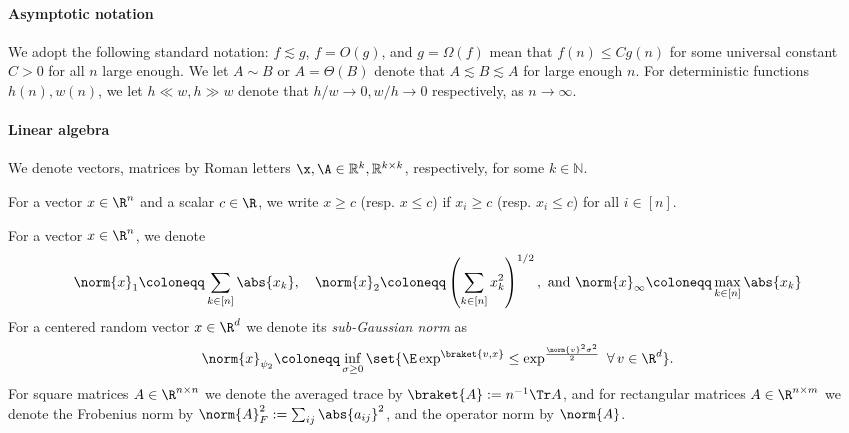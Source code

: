 \paragraph*{Asymptotic notation}
We adopt the following standard notation: \(f \lesssim g\), \(f = O(g)\), and \(g = \Omega(f)\) mean that \(f(n) \leq Cg(n)\) for some universal constant \(C > 0\) for all \(n\) large enough.
We let $A \sim B$ or \(A = \Theta(B)\) denote that $A \lesssim B \lesssim A$ for large enough $n$.  
For deterministic functions $h(n), w(n)$, we let $h \ll w, h \gg w$ denote that $h/w \to 0, w/h \to 0$ respectively, as $n \to \infty$. 

\paragraph*{Linear algebra}
We denote vectors, matrices by Roman letters $\x, \A \in \mathbb{R}^k, \mathbb{R}^{k \times k}$, respectively, for some $k \in \mathbb{N}$. 

\noindent
For a vector \(x \in \R^n\) and a scalar \(c \in \R\), we write \(x \geq c\) (resp. \(x \leq c\)) if \(x_i \geq c\) (resp. \(x_i \leq c\)) for all \(i \in [n]\).

\noindent
For a vector \(x \in \R^n\), we denote 
\begin{equation}
\begin{aligned}
  \norm{x}_1 \coloneqq \sum_{k \in [n]} \abs{x_k}, \quad 
  \norm{x}_2 \coloneqq \left(\sum_{k \in [n]} x_k^2\right)^{1/2}, \text{ and }
  \norm{x}_{\infty} \coloneqq \max_{k \in [n]}\abs{x_k}
\end{aligned}
\end{equation}
For a centered random vector \(x \in \R^d\) we denote its \emph{sub-Gaussian norm} as
\begin{equation}
        \norm{x}_{\psi_2} \coloneqq \inf_{\sigma 
        \geq 0} \set{\E \exp^{\braket{v, x}} \leq \exp^{\frac{\norm{v}^2 \sigma^2}{2}}\ \forall\, v \in \R^d}.
\end{equation}
\noindent
For square matrices $A\in\R^{n\times n}$ we denote the averaged trace by $\braket{A}:=n^{-1}\Tr A$, and for rectangular matrices $A\in\R^{n\times m}$ we denote the Frobenius norm by $\norm{A}_F^2:=\sum_{ij}\abs{a_{ij}}^2$, and the operator norm by $\norm{A}$. 

